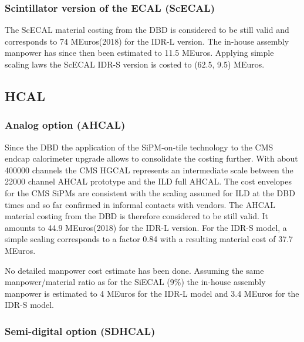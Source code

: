 
\subsubsection{Scintillator version of the ECAL (ScECAL)}
The ScECAL material costing from the DBD is considered to be still valid and corresponds to 74 MEuros(2018) for the IDR-L version. The in-house assembly manpower has since then been estimated to 11.5 MEuros. Applying simple scaling laws the ScECAL IDR-S version is costed to (62.5, 9.5) MEuros.

\subsection{HCAL}

\subsubsection{Analog option (AHCAL)}
Since the DBD the application of the SiPM-on-tile technology to the CMS endcap calorimeter upgrade allows to consolidate the costing further. With about 400000 channels the CMS HGCAL represents an intermediate scale between the 22000 channel AHCAL prototype and the ILD full AHCAL. 
The cost envelopes for the CMS SiPMs are consistent with the scaling assumed for ILD at the DBD times and so far confirmed in informal contacts with vendors. The AHCAL material costing from the DBD is therefore considered to be still valid. It amounts to 44.9 MEuros(2018) for the IDR-L version. 
For the IDR-S model, a simple scaling corresponds to a factor 0.84 with a resulting material cost of 37.7 MEuros.

No detailed manpower cost estimate has been done. Assuming the same manpower/material ratio as for the SiECAL (9\%) the in-house assembly manpower is estimated to 4 MEuros for the IDR-L model and 3.4 MEuros for the IDR-S model.

\subsubsection{Semi-digital option (SDHCAL)}

